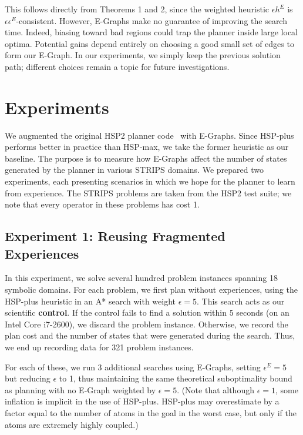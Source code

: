 \documentclass[letterpaper]{article}
\begin{document}
This follows directly from Theorems 1 and 2, since the weighted heuristic $\epsilon h^E$ is $\epsilon \epsilon^E$-consistent.
However, E-Graphs make no guarantee of improving the search time. Indeed, biasing toward bad regions could trap the planner inside large local optima.
Potential gains depend entirely on choosing a good small set of edges to form our E-Graph.
In our experiments, we simply keep the previous solution path; different choices remain a topic for future investigations.

\section{Experiments}

We augmented the original HSP2 planner code~\cite{bonet2001planning} with E-Graphs.
Since HSP-plus performs better in practice than HSP-max, we take the former heuristic as our baseline.
The purpose is to measure how E-Graphs affect the number of states generated by the planner in various STRIPS domains.
We prepared two experiments, each presenting scenarios in which we hope for the planner to learn from experience.
The STRIPS problems are taken from the HSP2 test suite; we note that every operator in these problems has cost 1.

\subsection{Experiment 1: Reusing Fragmented Experiences}

In this experiment, we solve several hundred problem instances spanning 18 symbolic domains.
For each problem, we first plan without experiences, using the HSP-plus heuristic in an A* search with weight $\epsilon=5$.
This search acts as our scientific \textbf{control}.
If the control fails to find a solution within 5 seconds (on an Intel Core i7-2600), we discard the problem instance.
Otherwise, we record the plan cost and the number of states that were generated during the search.
Thus, we end up recording data for 321 problem instances.

For each of these, we run 3 additional searches using E-Graphs, setting $\epsilon^E=5$ but reducing $\epsilon$ to 1, thus maintaining the same theoretical suboptimality bound as planning with no E-Graph weighted by $\epsilon=5$.
(Note that although $\epsilon = 1$, some inflation is implicit in the use of HSP-plus.
HSP-plus may overestimate by a factor equal to the number of atoms in the goal in the worst case, but only if the atoms are extremely highly coupled.)
\end{document}
